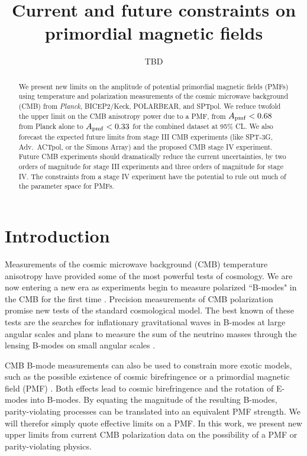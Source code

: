 \documentclass[preprint]{emulateapj}
\newcommand{\apmf}{\ensuremath{A_{\rm pmf}}}
\newcommand{\planck}{{\sl Planck}}
\newcommand{\bicepkeck}{BICEP2/Keck}
\newcommand{\sptnew}{SPT-3G}
\newcommand{\pb}{POLARBEAR}
\newcommand{\simons}{Simons Array}
\newcommand{\sptpol}{SPTpol}
\newcommand{\advactpol}{Adv.~ACTpol}
\newcommand{\tbd}[1]{\textcolor{Red}{{\bf TBD}: #1}}
\begin{document}
\title{Current and future constraints on primordial magnetic fields}
\author{TBD}


\begin{abstract}

We present new limits on the amplitude of potential primordial magnetic fields (PMFs) using temperature and polarization measurements of the cosmic microwave background (CMB)  from \planck{}, \bicepkeck{}, \pb, and \sptpol. 
We reduce twofold the upper limit on the CMB anisotropy power due to a PMF, from $\apmf < 0.68$ from Planck alone to $\apmf < 0.33$ for the combined dataset at 95\% CL. 
We also forecast the expected future limits from stage III CMB experiments (like \sptnew{},  \advactpol, or the \simons) and the proposed CMB stage IV experiment. 
Future CMB experiments should dramatically reduce the current uncertainties, by two orders of magnitude for stage III experiments and three orders of magnitude for stage IV. 
The constraints from a stage IV experiment have the potential to rule out much of the parameter space for PMFs.

\end{abstract}

\section{Introduction}
\label{sec:intro}

Measurements of the cosmic microwave background (CMB) temperature anisotropy have provided some of the most powerful tests of cosmology. 
We are now entering a new era as experiments begin to measure  polarized ``B-modes" in the CMB for the first time \citep{XXXX}. 
Precision measurements of CMB polarization promise new tests of the standard cosmological model. 
The best known of these tests are the searches for inflationary gravitational waves in B-modes at large angular scales \citep{XXX} and plans to measure the sum of the neutrino masses through the lensing B-modes on small angular scales \citep{XXX}. 

CMB B-mode measurements can also be used to constrain more exotic models, such as the possible existence of cosmic birefringence \citep{carroll98,lue99} or a primordial magnetic field (PMF) \citep{kosowsky96, seshadri01}.  
Both effects lead to cosmic birefringence and the rotation of E-modes into B-modes. 
By equating the magnitude of the resulting B-modes, parity-violating processes can be translated into an equivalent PMF strength. 
We will therefor simply quote effective limits on a PMF. 
In this work, we present new upper limits from current CMB polarization data on the possibility of a PMF or parity-violating physics. 
\end{document}
